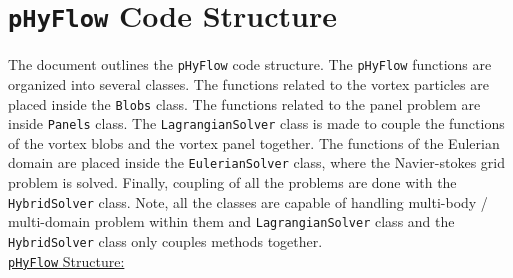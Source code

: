 
\chapter{\texttt{pHyFlow} Code Structure}
\label{app:code}%


%
The document outlines the \texttt{pHyFlow} code structure. The \texttt{pHyFlow} functions are organized into several classes. The functions related to the vortex particles are placed inside the \texttt{Blobs} class. The functions related to the panel problem are inside \texttt{Panels} class. The \texttt{LagrangianSolver} class is made to couple the functions of the vortex blobs and the vortex panel together. The functions of the Eulerian domain are placed inside the \texttt{EulerianSolver} class, where the Navier-stokes grid problem is solved. Finally, coupling of all the problems are done with the \texttt{HybridSolver} class. Note, all the classes are capable of handling multi-body / multi-domain problem within them and \texttt{LagrangianSolver} class and the \texttt{HybridSolver} class only couples methods together.\\

\underline{\texttt{pHyFlow} Structure:}
\begin{figure}[h]
\centering
{}
\end{figure}
\newpage

